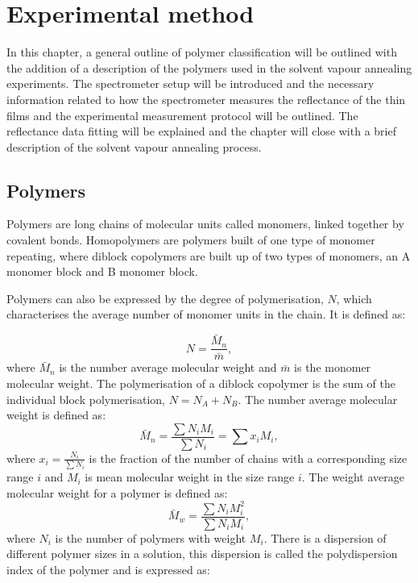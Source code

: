 \documentclass[MasterThesisMain.tex]{subfiles}
\begin{document}
	\chapter{Experimental method}\label{experimentalmethod}
	
In this chapter, a general outline of polymer classification will be outlined with the addition of a description of the polymers used in the solvent vapour annealing experiments. The spectrometer setup will be introduced and the necessary information related to how the spectrometer measures the reflectance of the thin films and the experimental measurement protocol will be outlined. The reflectance data fitting will be explained and the chapter will close with a brief description of the solvent vapour annealing process. 
	
\section{Polymers}
Polymers are long chains of molecular units called monomers, linked together by covalent bonds. Homopolymers are polymers built of one type of monomer repeating, where diblock copolymers are built up of two types of monomers, an A monomer block and B monomer block. 

Polymers can also be expressed by the degree of polymerisation, $N$, which characterises the average number of monomer units in the chain. It is defined as:

\begin{equation}
N = \frac{\bar{M}_n}{\bar{m}},
\end{equation}
where $\bar{M}_n$ is the number average molecular weight and $\bar{m}$ is the monomer molecular weight. The polymerisation of a diblock copolymer is the sum of the individual block polymerisation, $N = N_A + N_B$. The number average molecular weight is defined as:
\begin{equation}
\bar{M}_n = \frac{\sum N_iM_i}{\sum N_i} = \sum x_iM_i,
\end{equation}      
where $x_i = \frac{N_i}{\sum N_i}$ is the fraction of the number of chains with a corresponding size range $i$ and $M_i$ is mean molecular weight in the size range $i$. The weight average molecular weight for a polymer is defined as:
\begin{equation}
\bar{M}_w=\frac{\sum N_iM_i^2}{\sum N_iM_i},
\end{equation}
where $N_i$ is the number of polymers with weight $M_i$. There is a dispersion of different polymer sizes in a solution, this dispersion is called the polydispersion index of the polymer and is expressed as:
\end{document}
